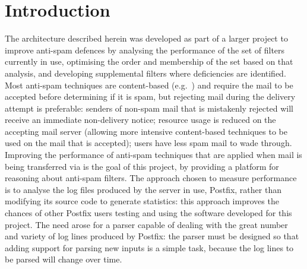 \chapter{Introduction}

\label{introduction}

The architecture described herein was developed as part of a larger project
to improve anti-spam defences by analysing the performance of the set of
filters currently in use, optimising the order and membership of the set
based on that analysis, and developing supplemental filters where
deficiencies are identified.  Most anti-spam techniques are content-based
(e.g.~\cite{a-plan-for-spam, word-stemming, relaxed-online-svms}) and
require the mail to be accepted before determining if it is spam, but
rejecting mail during the delivery attempt is preferable: senders of
non-spam mail that is mistakenly rejected will receive an immediate
non-delivery notice; resource usage is reduced on the accepting mail server
(allowing more intensive content-based techniques to be used on the mail
that is accepted); users have less spam mail to wade through.  Improving
the performance of anti-spam techniques that are applied when mail is being
transferred via  is the goal of this project, by providing a
platform for reasoning about anti-spam filters.  The approach chosen to
measure performance is to analyse the log files produced by the
 server in use, Postfix, rather than modifying its source
code to generate statistics: this approach improves the chances of other
Postfix users testing and using the software developed for this project.
The need arose for a parser capable of dealing with the great number and
variety of log lines produced by Postfix: the parser must be designed so
that adding support for parsing new inputs is a simple task, because the
log lines to be parsed will change over time.

